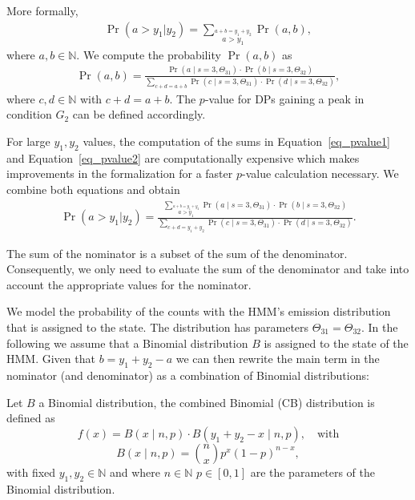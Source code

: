\noindent
More formally,
\begin{align}
 \Pr(a > y_{1}|y_{2}) = \sum_{\stackrel{a + b = y_{1}+ y_{2}}{a > y_{1}}} \Pr(a,b), \label{eq_pvalue1}
\end{align}
\noindent
where $a,b \in \mathbb{N}$.
We compute the probability $\Pr(a,b)$ as
\begin{align}
 \Pr(a,b) = \frac{\Pr(a \mid s=3, \Theta_{31}) \cdot \Pr(b \mid s=3, \Theta_{32})}{\sum_{c + d=a+b} \Pr(c \mid s=3, \Theta_{31}) \cdot \Pr(d \mid s=3, \Theta_{32})} \label{eq_pvalue2},
\end{align}
\noindent
where $c,d \in \mathbb{N}$ with $c+d=a+b$.
The $p$-value for DPs gaining a peak in condition $G_2$ can be defined accordingly.

For large $y_1, y_2$ values, the computation of the sums in Equation~\ref{eq_pvalue1} and Equation~\ref{eq_pvalue2} are computationally expensive which makes improvements in the formalization for a faster $p$-value calculation necessary.
We combine both equations and obtain 
\begin{align}
 \Pr(a > y_{1}|y_{2}) = \frac{\sum_{\stackrel{a + b = y_{1}+ y_{2}}{a > y_{1}}} \Pr(a \mid s=3, \Theta_{31})  \cdot \Pr(b \mid s=3, \Theta_{32})}{\sum_{c + d = y_{1}+ y_{2} } \Pr(c \mid s=3, \Theta_{31}) \cdot \Pr(d \mid s=3, \Theta_{32})} \label{eq_pvalue}.
\end{align}

\noindent
The sum of the nominator is a subset of the sum of the denominator. 
Consequently, we only need to evaluate the sum of the denominator and take into account the appropriate values for the nominator.

We model the probability of the counts with the HMM's emission distribution that is assigned to the  state.
The distribution has parameters $\Theta_{31} = \Theta_{32}$.
In the following we assume that a Binomial distribution $B$ is assigned to the  state of the HMM.
Given that $b=y_1 + y_2 - a$ we can then rewrite the main term in the nominator (and denominator) as a combination of Binomial distributions:

\begin{mydef}
 Let $B$ a Binomial distribution, the combined Binomial (CB) distribution is defined as
 $$f(x) = B(x \mid n, p) \cdot B(y_1 + y_2 - x \mid n, p), \quad \text{with}$$
 $$B(x \mid n, p) = {n \choose x} p^x (1-p)^{n-x},$$
 with fixed $y_1, y_2 \in \mathbb{N}$ and where $n \in \mathbb{N}$ $p \in [0,1]$ are the parameters of the Binomial distribution.
\end{mydef}

